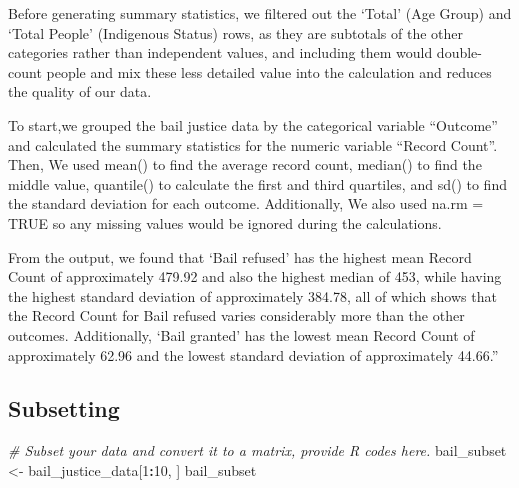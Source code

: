 \documentclass[
]{article}
\newenvironment{Shaded}{\begin{snugshade}}{\end{snugshade}}
\newcommand{\CommentTok}[1]{\textcolor[rgb]{0.56,0.35,0.01}{\textit{#1}}}
\newcommand{\DecValTok}[1]{\textcolor[rgb]{0.00,0.00,0.81}{#1}}
\newcommand{\NormalTok}[1]{#1}
\newcommand{\OtherTok}[1]{\textcolor[rgb]{0.56,0.35,0.01}{#1}}
\newcommand{\SpecialCharTok}[1]{\textcolor[rgb]{0.81,0.36,0.00}{\textbf{#1}}}
\begin{document}
Before generating summary statistics, we filtered out the `Total' (Age
Group) and `Total People' (Indigenous Status) rows, as they are
subtotals of the other categories rather than independent values, and
including them would double-count people and mix these less detailed
value into the calculation and reduces the quality of our data.

To start,we grouped the bail justice data by the categorical variable
``Outcome'' and calculated the summary statistics for the numeric
variable ``Record Count''. Then, We used mean() to find the average
record count, median() to find the middle value, quantile() to calculate
the first and third quartiles, and sd() to find the standard deviation
for each outcome. Additionally, We also used na.rm = TRUE so any missing
values would be ignored during the calculations.

From the output, we found that `Bail refused' has the highest mean
Record Count of approximately 479.92 and also the highest median of 453,
while having the highest standard deviation of approximately 384.78, all
of which shows that the Record Count for Bail refused varies
considerably more than the other outcomes. Additionally, `Bail granted'
has the lowest mean Record Count of approximately 62.96 and the lowest
standard deviation of approximately 44.66.''

\subsection{\texorpdfstring{\textbf{Subsetting}}{Subsetting}}\label{subsetting}

\begin{Shaded}
\begin{Highlighting}[]
\CommentTok{\# Subset your data and convert it to a matrix, provide R codes here.}
\NormalTok{bail\_subset }\OtherTok{\textless{}{-}}\NormalTok{ bail\_justice\_data[}\DecValTok{1}\SpecialCharTok{:}\DecValTok{10}\NormalTok{, ]}
\NormalTok{bail\_subset}
\end{Highlighting}
\end{Shaded}
\end{document}
